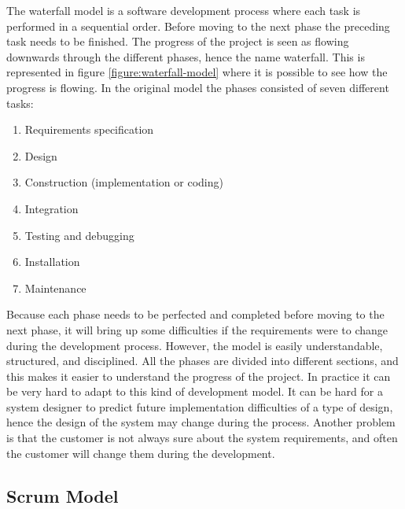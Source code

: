 The waterfall model is a software development process where each task is performed in a sequential order.
Before moving to the next phase the preceding task needs to be finished.
The progress of the project is seen as flowing downwards through the different phases, hence the name waterfall.
This is represented in figure \ref{figure:waterfall-model} where it is possible to see how the progress is flowing.
In the original model the phases consisted of seven different tasks:


\begin{enumerate}
\item Requirements specification
\item Design
\item Construction (implementation or coding)
\item Integration
\item Testing and debugging
\item Installation
\item Maintenance
\end{enumerate}

Because each phase needs to be perfected and completed before moving to the next phase, it will bring up some difficulties if the requirements were to change during the development process. 
However, the model is easily understandable, structured, and disciplined. 
All the phases are divided into different sections, and this makes it easier to understand the progress of the project.
In practice it can be very hard to adapt to this kind of development model. 
It can be hard for a system designer to predict future implementation difficulties of a type of design, hence the design of the system may change during the process.
Another problem is that the customer is not always sure about the system requirements, and often the customer will change them during the development.

\subsection{Scrum Model}

